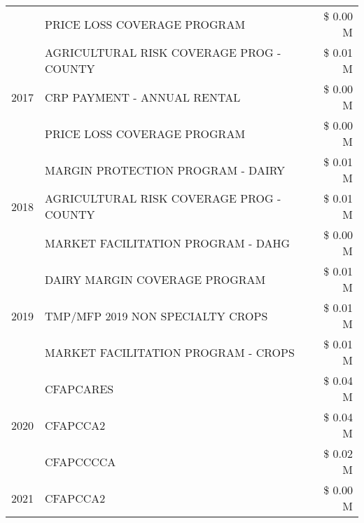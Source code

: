 \begin{tabular}{llr}
 & PRICE LOSS COVERAGE PROGRAM & \$ 0.00 M \\
\cline{1-3}
\multirow[t]{3}{*}{2017} & AGRICULTURAL RISK COVERAGE PROG - COUNTY & \$ 0.01 M \\
 & CRP PAYMENT - ANNUAL RENTAL & \$ 0.00 M \\
 & PRICE LOSS COVERAGE PROGRAM & \$ 0.00 M \\
\cline{1-3}
\multirow[t]{3}{*}{2018} & MARGIN PROTECTION PROGRAM - DAIRY & \$ 0.01 M \\
 & AGRICULTURAL RISK COVERAGE PROG - COUNTY & \$ 0.01 M \\
 & MARKET FACILITATION PROGRAM - DAHG & \$ 0.00 M \\
\cline{1-3}
\multirow[t]{3}{*}{2019} & DAIRY MARGIN COVERAGE PROGRAM & \$ 0.01 M \\
 & TMP/MFP 2019 NON SPECIALTY CROPS & \$ 0.01 M \\
 & MARKET FACILITATION PROGRAM - CROPS & \$ 0.01 M \\
\cline{1-3}
\multirow[t]{3}{*}{2020} & CFAPCARES & \$ 0.04 M \\
 & CFAPCCA2 & \$ 0.04 M \\
 & CFAPCCCCA & \$ 0.02 M \\
\cline{1-3}
2021 & CFAPCCA2 & \$ 0.00 M \\
\cline{1-3}
\bottomrule
\end{tabular}
